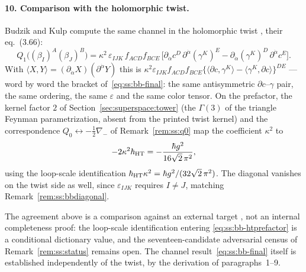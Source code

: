 \paragraph{10. Comparison with the holomorphic twist.} Budzik and Kulp
compute the same channel in the holomorphic twist \cite{BK}, their
eq.~(3.66):
\begin{equation}\label{eq:ss:bb-bkformula}
Q_1\big((\beta_I)^{A}(\beta_J)^{B}\big)
=\kappa^{2}\,\varepsilon_{IJK}\,f_{ACD}f_{BCE}\,
\big[\partial_{\dot\alpha}c^{D}\,\partial^{\dot\alpha}(\gamma^{K})^{E}
-\partial_{\dot\alpha}(\gamma^{K})^{D}\,\partial^{\dot\alpha}c^{E}\big].
\end{equation}
With $\langle X,Y\rangle=(\partial_{\dot\alpha}X)(\partial^{\dot\alpha}Y)$
this is
$\kappa^{2}\varepsilon_{IJK}f_{ACD}f_{BCE}
\{\langle\partial c,\gamma^{K}\rangle-\langle\gamma^{K},\partial c\rangle\}^{DE}$
--- word by word the bracket of~\eqref{eq:ss:bb-final}: the same antisymmetric
$\partial c$--$\gamma$ pair, the same ordering, the same $\varepsilon$ and the
same color tensor. On the prefactor, the kernel factor $2$ of
Section~\ref{sec:superspace:tower} (the $\Gamma(3)$ of the triangle Feynman
parametrization, absent from the printed twist kernel) and the correspondence
$Q_0\leftrightarrow-\tfrac12\nabla_-$ of Remark~\ref{rem:ss:q0} map the
coefficient $\kappa^{2}$ to
\begin{equation}\label{eq:ss:bb-htprefactor}
-2\kappa^{2}\hbar_{\mathrm{HT}}
=-\frac{\hbar g^{2}}{16\sqrt2\,\pi^{2}},
\end{equation}
using the loop-scale identification
$\hbar_{\mathrm{HT}}\kappa^{2}=\hbar g^{2}/(32\sqrt2\,\pi^{2})$. The diagonal
vanishes on the twist side as well, since $\varepsilon_{IJK}$ requires
$I\ne J$, matching Remark~\ref{rem:ss:bbdiagonal}.

\begin{remark}\label{rem:ss:bbhtstatus}
The agreement above is a comparison against an external target \cite{BK}, not
an internal completeness proof: the loop-scale identification entering
\eqref{eq:ss:bb-htprefactor} is a conditional dictionary value, and the
seventeen-candidate adversarial census of
Remark~\ref{rem:ss:status} remains open. The channel
result~\eqref{eq:ss:bb-final} itself is established independently of the
twist, by the derivation of paragraphs~1--9.
\end{remark}

